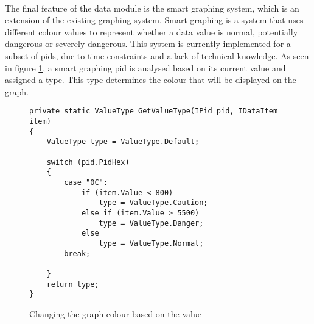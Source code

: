 {		\paragraph{}{
		The final feature of the data module is the smart graphing system, which is an extension of the existing graphing system. Smart graphing is a system that uses different colour values to represent whether a data value is normal, potentially dangerous or severely dangerous. This system is currently implemented for a subset of pids, due to time constraints and a lack of technical knowledge. As seen in figure \ref{code:ValueType}, a smart graphing pid is analysed based on its current value and assigned a type. This type determines the colour that will be displayed on the graph.
		}			
		
		\begin{figure}[h]
			\begin{lstlisting}		
private static ValueType GetValueType(IPid pid, IDataItem item)
{
	ValueType type = ValueType.Default;
				
	switch (pid.PidHex)
	{
		case "0C":		
			if (item.Value < 800)
				type = ValueType.Caution;
			else if (item.Value > 5500)
				type = ValueType.Danger;
			else
				type = ValueType.Normal;
		break;

	}
	return type;
}
			\end{lstlisting}
			\caption{Changing the graph colour based on the value}
			\label{code:ValueType}
		\end{figure}		
		
		
		\label{ssec:DataModuleDesc}
	}

